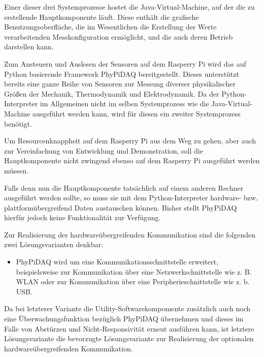 \documentclass[parskip=full]{scrartcl}
\begin{document}
Einer dieser drei Systemprozesse hostet die Java-Virtual-Machine, auf der die zu erstellende Hauptkomponente läuft. Diese enthält die grafische Benutzungsoberfläche, die im Wesentlichen die Erstellung der Werte verarbeitenden Messkonfiguration ermöglicht, und die auch deren Betrieb darstellen kann. 

Zum Ansteuern und Auslesen der Sensoren auf dem Rasperry Pi wird das auf Python basierende Framework PhyPiDAQ bereitgestellt. Dieses unterstützt bereits eine  ganze Reihe von Sensoren zur Messung diverser physikalischer Größen der Mechanik, Thermodynamik und Elektrodynamik. Da der Python-Interpreter im Allgemeinen nicht im selben Systemprozess wie die Java-Virtual-Machine ausgeführt werden kann, wird für diesen ein zweiter Systemprozess benötigt.

Um Resourcenknappheit auf dem Rasperry Pi aus dem Weg zu gehen, aber auch zur Vereinfachung von Entwicklung und Demonstration, soll die Hauptkomponente nicht zwingend ebenso auf dem Rasperry Pi ausgeführt werden müssen. 

Falls denn nun die Hauptkomponente tatsächlich auf einem anderen Rechner ausgeführt werden sollte, so muss sie mit dem Python-Interpreter hardware- bzw. plattformübergreifend Daten austauschen können. Bisher stellt PhyPiDAQ hierfür jedoch keine Funktionalität zur Verfügung.

Zur Realisierung der hardwareübergreifenden Kommunikation sind die folgenden zwei Lösungsvarianten denkbar: 

\begin{itemize}


	\item PhyPiDAQ wird um eine Kommunikationsschnittstelle erweitert, beispielsweise zur Kommunikation über eine Netzwerkschnittstelle wie z. B. WLAN oder zur Kommunikation über eine Peripherieschnittstelle wie z. b. USB.
	

\end{itemize}

Da bei letzterer Variante die Utility-Softwarekompomente zusätzlich auch noch eine Überwachungsfunktion bezüglich PhyPiDAQ übernehmen und dieses im Falle von Abstürzen und Nicht-Responsivität erneut ausführen kann, ist letztere Lösungsvariante die bevorzugte Lösungsvariante zur Realisierung der optionalen hardwareübergreifenden Kommunikation. 
\end{document}
